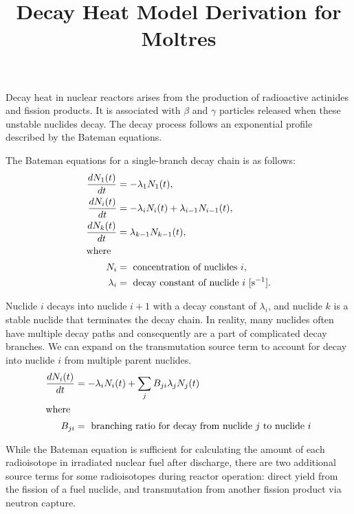\documentclass[letterpaper,11pt]{article}
\begin{document}
%
\title{Decay Heat Model Derivation for Moltres}
\author{}
\date{}
%
\maketitle
%
Decay heat in nuclear reactors arises from the production of radioactive
actinides and fission products. It is associated with
$\beta$ and $\gamma$ particles released when these unstable nuclides decay.
The decay process follows an exponential profile described by the Bateman
equations.

The Bateman equations for a single-branch decay chain is as follows:
%
\begin{align}
\frac{dN_1 (t)}{dt} &= - \lambda_1 N_1 (t), \\
\frac{dN_i (t)}{dt} &= - \lambda_i N_i (t) + \lambda_{i-1} N_{i-1} (t), \\
\frac{dN_k (t)}{dt} &= \lambda_{k-1} N_{k-1} (t), \\
\intertext{where}
N_i &= \text{ concentration of nuclides $i$} ,\nonumber \\
\lambda_i &= \text{ decay constant of nuclide $i$ [s$^{-1}$].} \nonumber
\end{align}

Nuclide $i$ decays into nuclide $i+1$ with a decay constant of $\lambda_i$,
and nuclide $k$ is a stable nuclide that terminates the decay chain. In
reality, many nuclides often have multiple decay paths and consequently are a
part of complicated decay branches. We can expand on
the transmutation source term to account for decay into nuclide $i$ from
multiple parent nuclides.
%
\begin{align}
\frac{dN_i (t)}{dt} &= - \lambda_i N_i (t) + \sum_j B_{ji} \lambda_j N_j (t)
\\
\intertext{where}
B_{ji} &= \text{ branching ratio for decay from nuclide $j$ to nuclide $i$}
\nonumber
\end{align}

While the Bateman equation is sufficient for calculating the amount of each
radioisotope in irradiated nuclear fuel after discharge, there are two
additional source terms for some radioisotopes during reactor operation:
direct yield from the fission of a fuel nuclide, and transmutation from
another fission product via neutron capture.
\end{document}

